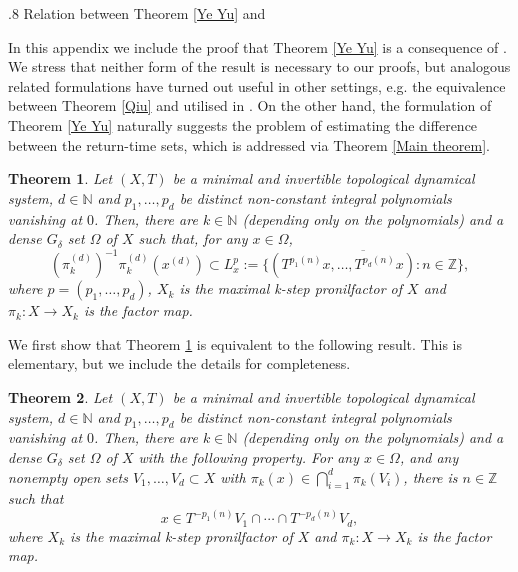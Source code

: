 \documentclass[reqno]{amsart}
\makeatletter
\def\Z{{\mathbb Z}}
\def\N{{\mathbb N}}
\newtheorem{theorem}{Theorem}[section]
\theoremstyle{definition}
\def\section{\@startsection{section}{1}%
  \z@{.5\linespacing\@plus.7\linespacing}
{.8\baselineskip}%
  {\normalfont\fontsize{11}{13}\centering\bfseries}%
}
\theoremstyle{remark}
\def\N{{\mathbb N}}
\makeatother
\begin{document}
\section{Relation between Theorem \ref{Ye Yu} and \cite[Theorem A]{Ye_Yu}} \label{appendix}

In this appendix we include the proof that Theorem 
\ref{Ye Yu} is a consequence of \cite[Theorem A]{Ye_Yu}. We 
stress that neither form of the result is necessary to our 
proofs, but analogous related formulations 
have turned out useful in other settings, e.g. the 
equivalence between Theorem \ref{Qiu} and \cite[Theorem B]{Qiu} utilised in \cite{GKLMRR}. On the other hand, the formulation of Theorem \ref{Ye Yu} naturally suggests the problem of estimating the difference between the return-time sets, which is addressed via Theorem \ref{Main theorem}.


\begin{theorem}{{\cite[Theorem A]{Ye_Yu}}}\label{YeYu original}
Let $(X,T)$ be a minimal and invertible topological dynamical system, $d\in \N$ and $p_1,\ldots,p_d$ be distinct non-constant integral polynomials vanishing at $0$. Then, there are $k\in \N$ (depending only on the
polynomials) and a dense $G_{\delta}$ set $\Omega$ of $X$ such that, for any $x\in \Omega$,
$$(\pi_k^{(d)})^{-1} \pi_k^{(d)} (x^{(d)}) \subset L_x^p:=\overline{\{ (T^{p_1(n)}x, \ldots, T^{p_d(n)}x): n\in \Z \} },$$
where $p=(p_1,\ldots,p_d)$, $X_k$ is the maximal k-step 
pronilfactor of $X$ and $\pi_k : X  \to X_k$ is the factor
map.    
\end{theorem}

We first show that Theorem \ref{YeYu original} is equivalent 
to the following result. This is elementary, but we include 
the details for completeness.

\begin{theorem}\label{YeYu2}
Let $(X,T)$ be a minimal and invertible topological dynamical system, $d\in \N$ and $p_1,\ldots,p_d$ be distinct non-constant integral polynomials vanishing at $0$. Then, there are $k\in \N$ (depending only on the
polynomials) and a dense $G_{\delta}$ set $\Omega$ of $X$ with the following property. For any $x\in \Omega$, and any nonempty open sets $V_1,\ldots,V_d \subset X$ with $\pi_k(x) \in \bigcap_{i=1}^d \pi_k(V_i)$, there is $n\in \Z$ such that
$$x \in T^{-p_1(n)}V_1 \cap \cdots \cap T^{-p_d(n)}V_d,$$
where $X_k$ is the maximal k-step 
pronilfactor of $X$ and $\pi_k : X  \to X_k$ is the factor
map.    
\end{theorem}
\end{document}
